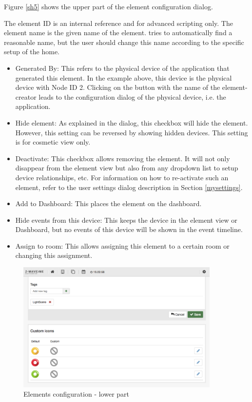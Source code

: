 Figure \ref{sh5} shows the upper part of the element configuration dialog.

The element ID is an internal reference and for advanced scripting only. The element name 
is the given name of the element. \zway tries to automatically find a reasonable name, but 
the user should change this name according to the specific setup of the home.

\begin{itemize}
\item Generated By: This refers to the physical device of the \zway application that 
generated this element. In the example above, this device is the physical \zwave device 
with Node ID 2. Clicking on the button with the name of the element-creator leads to the 
configuration dialog of the physical device, i.e. the \zway application.

\item Hide element: As explained in the dialog, this checkbox will hide the element. However, 
this setting can be reversed by showing hidden devices. This setting is for cosmetic view only.

\item Deactivate: This checkbox allows removing the element. It will not only disappear 
from the element view but also from any dropdown list to setup device relationships, etc. 
For information on how to re-activate such an element, refer to the user settings dialog 
description in Section \ref{mysettings}.

\item Add to Dashboard: This places the element on the dashboard.

\item Hide events from this device: This keeps the device in the element view or Dashboard, but 
no events of this device will be shown in the event timeline.

\item Assign to room: This allows assigning this element to a certain room or changing 
this assignment.

\end{itemize}

\begin{figure}
\begin{center}
\includegraphics[width=0.9\textwidth]{pngs/cap4/sh6.png}
\caption{Elements configuration  - lower part}
\label{sh6}
\end{center}
\end{figure}

